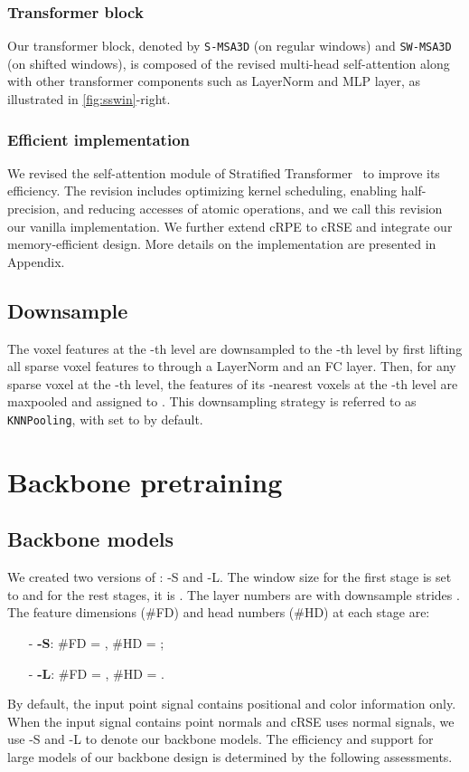 \documentclass[10pt,twocolumn,letterpaper]{article}
\begin{document}
\subsubsection{Transformer block} Our {\SST} transformer block, denoted by \texttt{S-MSA3D} (on regular windows) and \texttt{SW-MSA3D} (on shifted windows), is composed of the revised multi-head self-attention along with other transformer components such as LayerNorm and MLP layer, as illustrated in \cref{fig:sswin}-right.


\subsubsection{Efficient implementation} \label{subsec:efficent}
We revised the self-attention module of Stratified Transformer~\cite{lai2022stratified} to improve its efficiency. The revision includes optimizing kernel scheduling, enabling half-precision, and reducing accesses of atomic operations, and we call this revision our vanilla implementation. We further extend cRPE to cRSE and integrate our memory-efficient design.  More details on the implementation are presented in Appendix.


\subsection{Downsample} \label{subsec:downsample}
The voxel features at the -th level are downsampled to the -th level by first lifting all sparse voxel features to  through a LayerNorm and an FC layer. Then, for any sparse voxel  at the -th level, the features of its -nearest voxels at the -th level are maxpooled and assigned to . This downsampling strategy is referred to as \texttt{KNNPooling}, with  set to  by default.

\section{{\SST} Backbone pretraining}



\subsection{Backbone models} \label{subsec:backbonemodel}
We created two versions of {\SST}: {\SST}-S and {\SST}-L. The window size for the first stage is set to  and for the rest stages, it is . The layer numbers are  with downsample strides . The feature dimensions (\#FD) and head numbers (\#HD) at each stage are:
\begin{enumerate}[leftmargin=*]\item[-]\textbf{{\SST}-S}:  \#FD = , \#HD = ;
    \item[-]\textbf{{\SST}-L}:  \#FD = , \#HD = .
\end{enumerate}
By default, the input point signal contains positional and color information only. When the input signal contains point normals and cRSE uses normal signals, we use {\SST}-S and {\SST}-L to denote our backbone models.
The efficiency and support for large models of our backbone design is determined by the following assessments.
\end{document}
